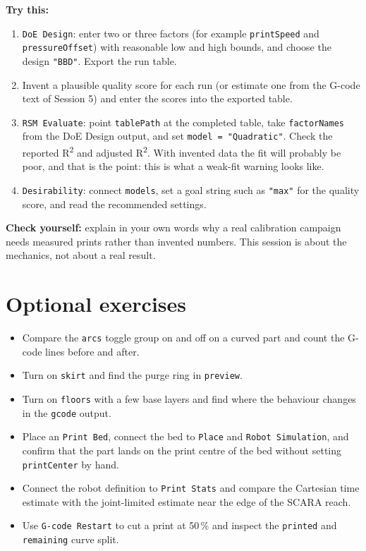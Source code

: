 \documentclass[11pt]{article}
\newcommand{\param}[1]{\texttt{#1}}
\newcommand{\exlabel}[1]{\par\vspace{0.3em}\noindent\textbf{#1:}\enspace}
\begin{document}
\exlabel{Try this}
\begin{enumerate}
  \item \param{DoE Design}: enter two or three factors (for example \param{printSpeed} and \param{pressureOffset}) with reasonable low and high bounds, and choose the design \texttt{"BBD"}. Export the run table.
  \item Invent a plausible quality score for each run (or estimate one from the G-code text of Session 5) and enter the scores into the exported table.
  \item \param{RSM Evaluate}: point \param{tablePath} at the completed table, take \param{factorNames} from the DoE Design output, and set \param{model = "Quadratic"}. Check the reported R\textsuperscript{2} and adjusted R\textsuperscript{2}. With invented data the fit will probably be poor, and that is the point: this is what a weak-fit warning looks like.
  \item \param{Desirability}: connect \param{models}, set a goal string such as \texttt{"max"} for the quality score, and read the recommended settings.
\end{enumerate}

\exlabel{Check yourself} explain in your own words why a real
calibration campaign needs measured prints rather than invented
numbers. This session is about the mechanics, not about a real result.

\section{Optional exercises}

\begin{itemize}
  \item Compare the \param{arcs} toggle group on and off on a curved part and count the G-code lines before and after.
  \item Turn on \param{skirt} and find the purge ring in \param{preview}.
  \item Turn on \param{floors} with a few base layers and find where the behaviour changes in the \param{gcode} output.
  \item Place an \param{Print Bed}, connect the bed to \param{Place} and \param{Robot Simulation}, and confirm that the part lands on the print centre of the bed without setting \param{printCenter} by hand.
  \item Connect the robot definition to \param{Print Stats} and compare the Cartesian time estimate with the joint-limited estimate near the edge of the SCARA reach.
  \item Use \param{G-code Restart} to cut a print at 50\,\% and inspect the \param{printed} and \param{remaining} curve split.
\end{itemize}
\end{document}
